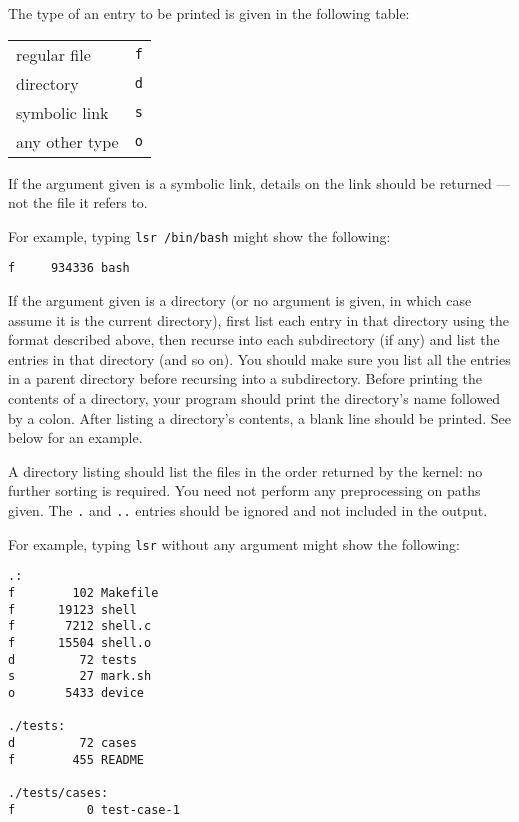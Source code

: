 \documentclass[12pt,a4paper]{article}
\begin{document}
\clearpage
The type of an entry to be printed is given in the following table:

\begin{longtable}{l c}
    \toprule

    regular file & \texttt{f} \\
    directory & \texttt{d} \\
    symbolic link & \texttt{s} \\
    any other type & \texttt{o} \\

    \bottomrule
\end{longtable}

If the argument given is a symbolic link, details on the link should be returned
--- not the file it refers to.

For example, typing \texttt{lsr /bin/bash} might show the following:

\begin{verbatim}
f     934336 bash\end{verbatim}

If the argument given is a directory (or no argument is given, in which case
assume it is the current directory), first list each entry in that directory
using the format described above, then recurse into each subdirectory (if any)
and list the entries in that directory (and so on). You should make sure you
list all the entries in a parent directory before recursing into a
subdirectory. Before printing the contents of a directory, your program should
print the directory's name followed by a colon. After listing a directory's
contents, a blank line should be printed.  See below for an example.

A directory listing should list the files in the order returned by the kernel:
no further sorting is required. You need not perform any preprocessing on paths
given. The \texttt{.} and \texttt{..} entries should be ignored and not
included in the output.

For example, typing \texttt{lsr} without any argument might show the following:

\begin{verbatim}
.:
f        102 Makefile
f      19123 shell
f       7212 shell.c
f      15504 shell.o
d         72 tests
s         27 mark.sh
o       5433 device

./tests:
d         72 cases
f        455 README

./tests/cases:
f          0 test-case-1
\end{verbatim}
\end{document}
